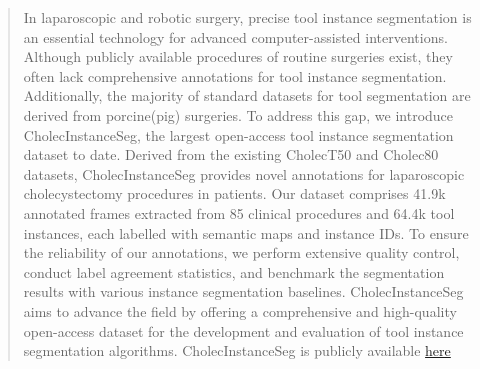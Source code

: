\begin{abstract}
In laparoscopic and robotic surgery, precise tool instance segmentation is an essential technology for advanced
computer-assisted interventions.
Although publicly available procedures of routine surgeries exist, they often lack comprehensive annotations for tool instance segmentation.
Additionally, the majority of standard datasets for tool segmentation are derived from porcine(pig) surgeries.
To address this gap, we introduce CholecInstanceSeg, the largest open-access tool instance segmentation dataset to date. 
Derived from the existing CholecT50 and Cholec80 datasets, CholecInstanceSeg provides novel annotations for laparoscopic cholecystectomy procedures in patients.
Our dataset comprises 41.9k annotated frames extracted from 85 clinical procedures and 64.4k tool instances, each labelled with semantic maps and instance IDs.
To ensure the reliability of our annotations, we perform extensive quality control, conduct label agreement statistics, and benchmark the segmentation results with various instance segmentation baselines. 
CholecInstanceSeg aims to advance the field by offering a comprehensive and high-quality open-access dataset for the development and evaluation of tool instance segmentation algorithms. 
CholecInstanceSeg is publicly available \href{https://www.synapse.org/Synapse:syn60239971/datasets/}{here}
\end{abstract}